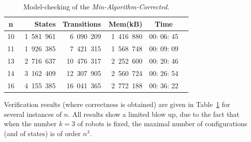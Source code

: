 \begin{table}[!h] 
\centering 
\setlength{\tabcolsep}{5pt}
\begin{tabular}{|c|r|r|r|c|r|}
\hline \textbf{n} &
\textbf{States} & \textbf{Transitions} & \textbf{Mem(kB)}&
\textbf{Time} \\ \hline 
10& ~1\, 581\, 961 & 6\, 090\, 209 & ~1\, 416\, 880 & 00: 06: 45 \\ \hline 
11& 1\, 926\, 385 & 7\, 421\, 315 & 1\, 568\, 748 & 00: 09: 09 \\ \hline 
13&2\, 716\, 637 & 10\, 476\, 317 & 2\, 252\, 600 & 00: 20: 46 \\ \hline 
14& 3\, 162\, 409 &12\, 307\, 905 & 2\, 560\, 724 & 00: 26: 54 \\ \hline 
16& 4\, 155\, 385 & 16\, 041\, 365& 2\, 772\, 188 & 00: 36: 22 \\ \hline 
\end{tabular} \caption{Model-checking of the
\emph{Min-Algorithm-Corrected}.} \label{tab: correct} \end{table}

Verification results (where correctness is obtained) are given in
Table~\ref{tab: correct} for several instances of $n$. All results
show a limited blow up, due to the fact that when the number $k=3$ of
robots is fixed, the maximal number of configurations (and of states) is
of order $n^3$.




		
		
		
		